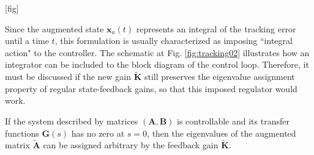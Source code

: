 \documentclass[a4paper,11pt]{book}
\numberwithin{figure}{chapter}
\numberwithin{equation}{chapter}
\numberwithin{table}{chapter}
\newtheorem{theorem}{Theorem}[chapter]
\theoremstyle{definition}
\newcounter{boxed-theorem}
\newenvironment{boxed-theorem}[1]
{\begin{shaded} \begin{theorem}{#1}}
{\end{theorem} \end{shaded}}
\newcounter{boxed-definition}
\begin{document}
[fig]

Since the augmented state $\bm{x}_a(t)$ represents an integral of the tracking error until a time $t$, this formulation is usually characterized as imposing ``integral action" to the controller. The schematic at Fig. \ref{fig:tracking02} illustrates how an integrator can be included to the block diagram of the control loop. Therefore, it must be discussed if the new gain $\tilde{\bm{K}}$ still preserves the eigenvalue assignment property of regular state-feedback gains, so that this imposed regulator would work.

\begin{boxed-theorem}
	If the system described by matrices $(\bm{A}, \bm{B})$ is controllable and its transfer functions $\bm{G}(s)$ has no zero at $s = 0$, then the eigenvalues of the augmented matrix $\tilde{\bm{A}}$ can be assigned arbitrary by the feedback gain $\tilde{\bm{K}}$.
\end{boxed-theorem}
\end{document}
